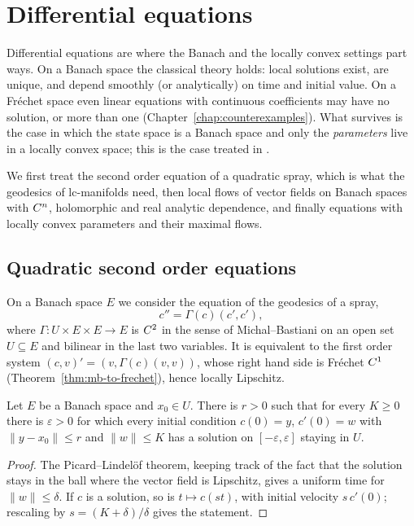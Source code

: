 \chapter{Differential equations}
\label{chap:ode}

Differential equations are where the Banach and the locally convex settings part ways. On a
Banach space the classical theory holds: local solutions exist, are unique, and depend smoothly
(or analytically) on time and initial value. On a Fréchet space even linear equations with
continuous coefficients may have no solution, or more than one
(Chapter~\ref{chap:counterexamples}). What survives is the case in which the state space is a
Banach space and only the \emph{parameters} live in a locally convex space; this is the case
treated in \cite[\S\S2.4--2.5]{GN26}.

We first treat the second order equation of a quadratic spray, which is what the geodesics of
lc-manifolds need, then local flows of vector fields on Banach spaces with $C^{n}$, holomorphic
and real analytic dependence, and finally equations with locally convex parameters and their
maximal flows.

\section{Quadratic second order equations}

On a Banach space $E$ we consider the equation of the geodesics of a spray,
\[
  c'' = \Gamma(c)(c', c'),
\]
where $\Gamma \colon U \times E \times E \to E$ is $C^{2}$ in the sense of Michal--Bastiani on
an open set $U \subseteq E$ and bilinear in the last two variables. It is equivalent to the first
order system $(c, v)' = (v, \Gamma(c)(v, v))$, whose right hand side is Fr\'echet $C^{1}$
(Theorem~\ref{thm:mb-to-frechet}), hence locally Lipschitz.

\begin{theorem}
  \label{thm:quadratic-ode-existence}
  \leanok
  Let $E$ be a Banach space and $x_0 \in U$. There is $r > 0$ such that for every $K \ge 0$ there
  is $\varepsilon > 0$ for which every initial condition $c(0) = y$, $c'(0) = w$ with
  $\|y - x_0\| \le r$ and $\|w\| \le K$ has a solution on $[-\varepsilon, \varepsilon]$ staying in
  $U$.
\end{theorem}

\begin{proof}
  \leanok
  The Picard--Lindel\"of theorem, keeping track of the fact that the solution stays in the ball
  where the vector field is Lipschitz, gives a uniform time for $\|w\| \le \delta$. If $c$ is a
  solution, so is $t \mapsto c(st)$, with initial velocity $s\, c'(0)$; rescaling by
  $s = (K + \delta)/\delta$ gives the statement.
\end{proof}

